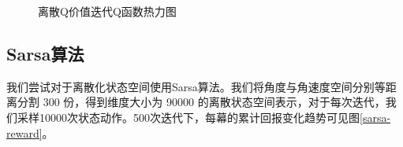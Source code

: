 \documentclass[conference,10pt]{IEEEtran}
\begin{document}
\begin{figure}[H]
{\begin{minipage}[t]{0.3\linewidth}
		\end{minipage}
	}%
	\centering
\caption{离散Q价值迭代Q函数热力图}
\label{QIheat}
\end{figure}
 

\subsection{Sarsa算法}
我们尝试对于离散化状态空间使用Sarsa算法。我们将角度与角速度空间分别等距离分割 300 份，得到维度大小为 90000 的离散状态空间表示，对于每次迭代，我们采样10000次状态动作。500次迭代下，每幕的累计回报变化趋势可见图\ref{sarsa-reward}。
\end{document}
